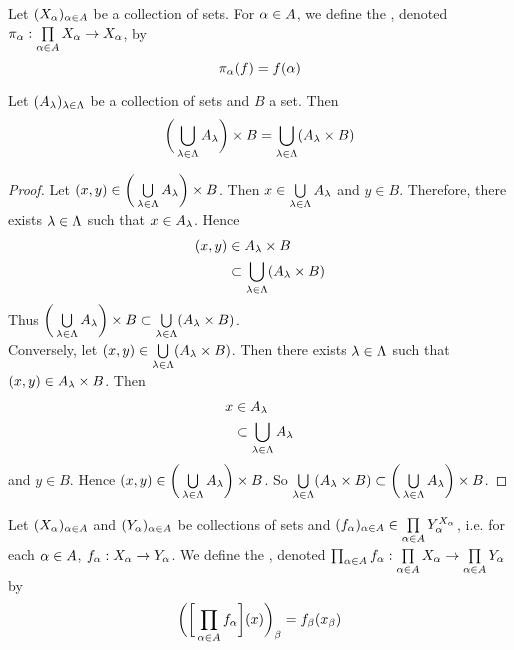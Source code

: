 \documentclass{book}
\begin{document}
	\begin{defn} 
	Let $(X_{\alpha})_{\alpha \in A}$ be a collection of sets. For $\alpha \in A$, we define the , denoted $\pi_{\alpha}:\prod\limits_{\alpha \in A}X_{\alpha} \rightarrow X_{\alpha}$, by 
	\begin{equation*}
	\pi_{\alpha}(f) = f(\alpha)
	\end{equation*}
	\end{defn}

	\begin{ex} 
		Let $(A_{\lambda})_{\lambda \in \Lambda}$ be a collection of sets and $B$ a set. Then 
		$$\bigg( \bigcup\limits_{\lambda \in \Lambda} A_{\lambda} \bigg) \times B = \bigcup\limits_{\lambda \in \Lambda} (A_{\lambda} \times B)$$
	\end{ex}

	\begin{proof}
		Let $(x,y) \in \bigg( \bigcup\limits_{\lambda \in \Lambda} A_{\lambda} \bigg) \times B$. Then $x \in \bigcup\limits_{\lambda \in \Lambda} A_{\lambda}$ and $y \in B$. Therefore, there exists $\lambda \in \Lambda$ such that $x \in A_{\lambda}$. Hence 
		\begin{align*}
			(x,y) 
			& \in A_{\lambda} \times B \\
			& \subset \bigcup\limits_{\lambda \in \Lambda} (A_{\lambda} \times B)
		\end{align*}
		Thus $\bigg( \bigcup\limits_{\lambda \in \Lambda} A_{\lambda} \bigg) \times B \subset  \bigcup\limits_{\lambda \in \Lambda} (A_{\lambda} \times B)$. \\
		Conversely, let $(x,y) \in \bigcup\limits_{\lambda \in \Lambda} (A_{\lambda} \times B)$. Then there exists $\lambda \in \Lambda$ such that $(x,y) \in A_{\lambda} \times B$. Then 
		\begin{align*}
			x 
			& \in A_{\lambda} \\
			& \subset \bigcup_{\lambda \in \Lambda} A_{\lambda}
		\end{align*}
		and $y \in B$. Hence $(x,y) \in \bigg( \bigcup\limits_{\lambda \in \Lambda} A_{\lambda} \bigg) \times B$. So $ \bigcup\limits_{\lambda \in \Lambda} (A_{\lambda} \times B) \subset \bigg( \bigcup\limits_{\lambda \in \Lambda} A_{\lambda} \bigg) \times B$.
	\end{proof}

	\begin{defn}   
		Let $(X_{\alpha})_{\alpha \in A}$ and $(Y_{\alpha})_{\alpha \in A}$ be collections of sets and $(f_{\alpha})_{\alpha \in A} \in \prod\limits_{\alpha \in A} Y_{\alpha}^{X_{\alpha}}$, i.e. for each $\alpha \in A$, $f_{\alpha}:X_{\alpha} \rightarrow Y_{\alpha}$. We define the , denoted $\prod_{\alpha \in A} f_{\alpha}: \prod\limits_{\alpha \in A} X_{\alpha} \rightarrow  \prod\limits_{\alpha \in A} Y_{\alpha}$ by 
		$$\bigg( \bigg[\prod_{\alpha \in A} f_{\alpha} \bigg] (x) \bigg)_{\beta} = f_{\beta}(x_{\beta})$$
	\end{defn}
	
\end{document}
